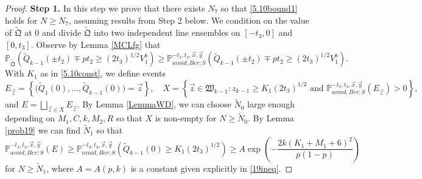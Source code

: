 \begin{proof}
	\noindent\textbf{Step 1.} In this step we prove that there exists $N_7$ so that \eqref{5.10bound1} holds for $N\geq N_7$, assuming results from Step 2 below. We condition on the value of $\tilde{\mathfrak{Q}}$ at 0 and divide $\tilde{\mathfrak{Q}}$ into two independent line ensembles on $[-t_3,0]$ and $[0,t_3]$. Observe by Lemma \ref{MCLfg} that
	\begin{equation}\label{5.10MC}
	\mathbb{P}_{\tilde{\mathfrak{Q}}}\left(\tilde{Q}_{k-1}(\pm t_2) \mp pt_2 \geq (2t_3)^{1/2}V_1^b\right) \geq \mathbb{P}^{-t_3,t_3,\vec{x},\vec{y}}_{avoid, Ber; S}\left(\tilde{Q}_{k-1}(\pm t_2) \mp pt_2 \geq (2t_3)^{1/2}V_1^b\right).
	\end{equation}
	With $K_1$ as in \eqref{5.10const}, we define events
	\[
	E_{\vec{z}} = \left\{\big(\tilde{Q}_1(0),\dots,\tilde{Q}_{k-1}(0)\big) = \vec{z}\right\}, \quad X = \left\{ \vec{z}\in\mathfrak{W}_{k-1} : z_{k-1} \geq K_1(2t_3)^{1/2} \mbox { and } \mathbb{P}^{-t_3,t_3,\vec{x},\vec{y}}_{avoid,Ber; S}(E_{\vec{z}}) > 0\right\},
	\]
	and $E = \bigsqcup_{\vec{z} \in X} E_{\vec{z}}$. By Lemma \ref{LemmaWD}, we can choose $\tilde{N}_0$ large enough depending on $M_1,C,k,M_2,R$ so that $X$ is non-empty for $N\geq\tilde{N}_0$. By Lemma \ref{prob19} we can find $\tilde{N}_1$ so that
	\begin{equation}\label{5.10Ebound}
	\mathbb{P}^{-t_3,t_3,\vec{x},\vec{y}}_{avoid, Ber; S}(E) \geq \mathbb{P}^{-t_3,t_3,\vec{x},\vec{y}}_{avoid,Ber; S}\left(\tilde{Q}_{k-1}(0) \geq K_1(2t_3)^{1/2}\right) \geq A\exp\left(-\frac{2k(K_1+M_1+6)^2}{p(1-p)}\right)
	\end{equation}
	for $N\geq\tilde{N}_1$, where $A = A(p,k)$ is a constant given explicitly in \eqref{19ineq}.
	

\end{proof}
